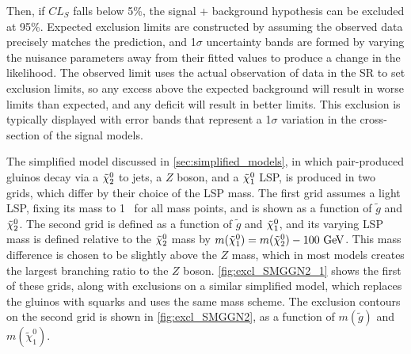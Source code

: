 Then, if $CL_S$ falls below 5\%, the signal + background hypothesis can be excluded at 95\%. Expected exclusion limits are constructed by assuming the observed data precisely matches the prediction, and 1$\sigma$ uncertainty bands are formed by varying the nuisance parameters away from their fitted values to produce a change in the likelihood. The observed limit uses the actual observation of data in the \ac{SR} to set exclusion limits, so any excess above the expected background will result in worse limits than expected, and any deficit will result in better limits. This exclusion is typically displayed with error bands that represent a 1$\sigma$ variation in the cross-section of the signal models. 

The simplified model discussed in \autoref{sec:simplified_models}, in which pair-produced gluinos decay via a $\tilde{\chi}_2^0$ to jets, a $Z$ boson, and a $\tilde{\chi}_1^0$ \ac{LSP}, is produced in two grids, which differ by their choice of the \ac{LSP} mass. The first grid assumes a light \ac{LSP}, fixing its mass to 1 \gev~for all mass points, and is shown as a function of $\tilde{g}$ and $\tilde{\chi}_2^0$. The second grid is defined as a function of $\tilde{g}$ and $\tilde{\chi}_1^0$, and its varying \ac{LSP} mass is defined relative to the $\tilde{\chi}_2^0$ mass by $m(\tilde{\chi}^{0}_{1}) = m(\tilde{\chi}^{0}_{2}) - 100 \gev$. This mass difference is chosen to be slightly above the $Z$ mass, which in most models creates the largest branching ratio to the $Z$ boson. \autoref{fig:excl_SMGGN2_1} shows the first of these grids, along with exclusions on a similar simplified model, which replaces the gluinos with squarks and uses the same mass scheme. The exclusion contours on the second grid is shown in \autoref{fig:excl_SMGGN2}, as a function of $m(\tilde{g})$ and $m(\tilde{\chi}^{0}_{1})$.


